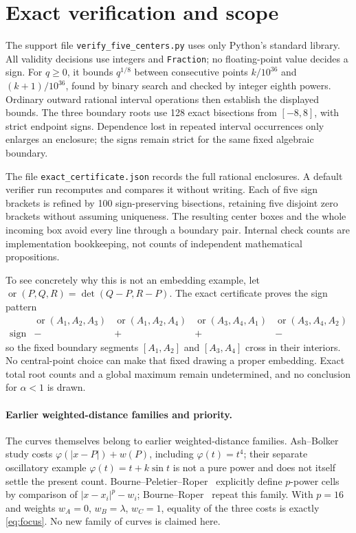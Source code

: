\documentclass[11pt]{article}
\newcommand{\detv}[2]{\det(#1,#2)}
\begin{document}
\section{Exact verification and scope}
The support file \texttt{verify\_five\_centers.py} uses only Python's standard library. All validity decisions use integers and \texttt{Fraction}; no floating-point value decides a sign. For $q\geq0$, it bounds $q^{1/8}$ between consecutive points $k/10^{36}$ and $(k+1)/10^{36}$, found by binary search and checked by integer eighth powers. Ordinary outward rational interval operations then establish the displayed bounds. The three boundary roots use 128 exact bisections from $[-8,8]$, with strict endpoint signs. Dependence lost in repeated interval occurrences only enlarges an enclosure; the signs remain strict for the same fixed algebraic boundary.

The file \texttt{exact\_certificate.json} records the full rational enclosures. A default verifier run recomputes and compares it without writing. Each of five sign brackets is refined by 100 sign-preserving bisections, retaining five disjoint zero brackets without assuming uniqueness. The resulting center boxes and the whole incoming box avoid every line through a boundary pair. Internal check counts are implementation bookkeeping, not counts of independent mathematical propositions.

To see concretely why this is not an embedding example, let
$\operatorname{or}(P,Q,R)=\detv{Q-P}{R-P}$. The exact certificate proves the sign pattern
\[
\begin{array}{c|cccc}
 &\operatorname{or}(A_1,A_2,A_3)&\operatorname{or}(A_1,A_2,A_4)&
 \operatorname{or}(A_3,A_4,A_1)&\operatorname{or}(A_3,A_4,A_2)\\\hline
 \text{sign}&-&+&+&-
\end{array}
\]
so the fixed boundary segments $[A_1,A_2]$ and $[A_3,A_4]$ cross in their interiors. No central-point choice can make that fixed drawing a proper embedding. Exact total root counts and a global maximum remain undetermined, and no conclusion for $\alpha<1$ is drawn.

\paragraph{Earlier weighted-distance families and priority.}
The curves themselves belong to earlier weighted-distance families. Ash--Bolker~\cite{AB} study costs $\varphi(|x-P|)+w(P)$, including $\varphi(t)=t^4$; their separate oscillatory example $\varphi(t)=t+k\sin t$ is not a pure power and does not itself settle the present count. Bourne--Peletier--Roper~\cite[Definition~4.12 in the author manuscript]{BPR} explicitly define $p$-power cells by comparison of $|x-x_i|^p-w_i$; Bourne--Roper~\cite[Section~5, p.~2568]{BR} repeat this family. With $p=16$ and weights $w_A=0$, $w_B=\lambda$, $w_C=1$, equality of the three costs is exactly \eqref{eq:focus}. No new family of curves is claimed here.
\end{document}
